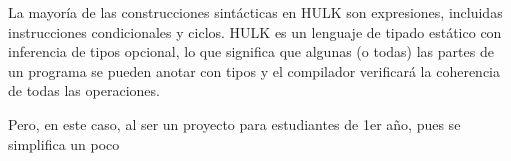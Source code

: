     La mayoría de las construcciones sintácticas en HULK son expresiones, incluidas instrucciones condicionales y ciclos. HULK es un lenguaje de tipado estático con inferencia de tipos opcional, lo que significa que algunas (o todas) las partes de un programa se pueden anotar con tipos y el compilador verificará la coherencia de todas las operaciones.

    Pero, en este caso, al ser un proyecto para estudiantes de 1er año, pues se simplifica un poco